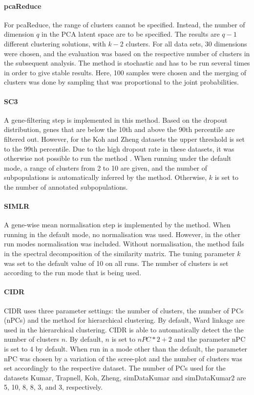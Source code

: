 \documentclass[12pt, a4paper]{article}\usepackage[]{graphicx}\usepackage[]{color}
\begin{document}
\paragraph{pcaReduce}
For pcaReduce, the range of clusters cannot be specified. Instead, the number of dimension $q$ in the PCA latent space are to be specified. The results are $q-1$ different clustering solutions, with $k-2$ clusters. For all data sets, 30 dimensions were chosen, and the evaluation was based on the respective number of clusters in the subsequent analysis. The method is stochastic and has to be run several times in order to give stable results. Here, 100 samples were chosen and the merging of clusters was done by sampling that was proportional to the joint probabilities. 
\paragraph{SC3}
A gene-filtering step is implemented in this method. Based on the dropout distribution, genes that are below the 10th and above the 90th percentile are filtered out. However, for the Koh and Zheng datasets the upper threshold is set to the 99th percentile. Due to the high dropout rate in these datasets, it was otherwise not possible to run the method .
When running under the default mode, a range of clusters from 2 to 10 are given, and the number of subpopulations is automatically inferred by the method. Otherwise, $k$ is set to the number of annotated subpopulations. 
\paragraph{SIMLR}
A gene-wise mean normalisation step is implemented by the method. When running in the default mode, no normalisation was used. However, in the other run modes normalisation was included. Without normalisation, the method fails in the spectral decomposition of the similarity matrix. 
The tuning parameter $k$ was set to the default value of 10 on all runs. The number of clusters is set according to the run mode that is being used.
\paragraph{CIDR}
CIDR uses three parameter settings: the number of clusters, the number of PCs (nPCs) and the method for hierarchical clustering. By default, Ward linkage are used in the hierarchical clustering. CIDR is able to automatically detect the the number of clusters $n$. By default, $n$ is set to $nPC*2+2$ and the parameter nPC is set to 4 by default. When run in a mode other than the default, the parameter nPC was chosen by a variation of the scree-plot and the number of clusters was set accordingly to the respective dataset. 
The number of PCs used for the datasets Kumar, Trapnell, Koh, Zheng, simDataKumar and simDataKumar2 are  5, 10, 8, 8, 3, and 3, respectively.
\end{document}
